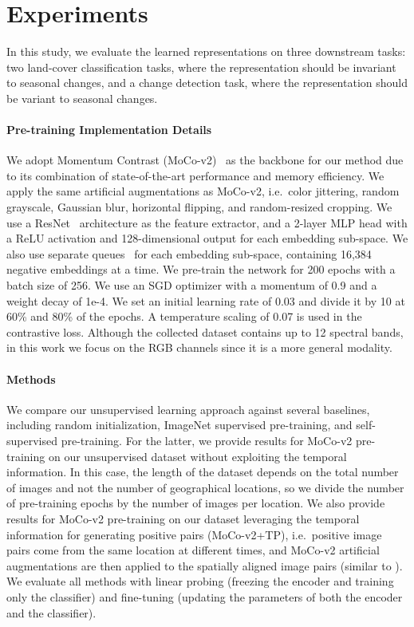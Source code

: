 \documentclass[10pt,twocolumn,letterpaper]{article}
\begin{document}
\section{Experiments}
In this study, we evaluate the learned representations on three downstream tasks: two land-cover classification tasks, where the representation should be invariant to seasonal changes, and a change detection task, where the representation should be variant to seasonal changes.

\vspace{-1em}\paragraph{Pre-training Implementation Details}
We adopt Momentum Contrast (MoCo-v2)~\cite{chen2020improved} as the backbone for our method due to its combination of state-of-the-art performance and memory efficiency. We apply the same artificial augmentations as MoCo-v2, i.e.\ color jittering, random grayscale, Gaussian blur, horizontal flipping, and random-resized cropping. We use a ResNet~\cite{he2016deep} architecture as the feature extractor, and a 2-layer MLP head with a ReLU activation and 128-dimensional output for each embedding sub-space. We also use separate queues~\cite{he2020momentum} for each embedding sub-space, containing 16,384 negative embeddings at a time. We pre-train the network for 200 epochs with a batch size of 256. We use an SGD optimizer with a momentum of 0.9 and a weight decay of 1e-4. We set an initial learning rate of 0.03 and divide it by 10 at 60\% and 80\% of the epochs. A temperature scaling  of 0.07 is used in the contrastive loss. Although the collected dataset contains up to 12 spectral bands, in this work we focus on the RGB channels since it is a more general modality.

\vspace{-1em}\paragraph{Methods}
We compare our unsupervised learning approach against several baselines, including random initialization, ImageNet supervised pre-training, and self-supervised pre-training. For the latter, we provide results for MoCo-v2 pre-training on our unsupervised dataset without exploiting the temporal information. In this case, the length of the dataset depends on the total number of images and not the number of geographical locations, so we divide the number of pre-training epochs by the number of images per location. We also provide results for MoCo-v2 pre-training on our dataset leveraging the temporal information for generating positive pairs (MoCo-v2+TP), i.e.\ positive image pairs come from the same location at different times, and MoCo-v2 artificial augmentations are then applied to the spatially aligned image pairs (similar to \citet{ayush2020geography}). We evaluate all methods with linear probing (freezing the encoder and training only the classifier) and fine-tuning (updating the parameters of both the encoder and the classifier).
\end{document}

